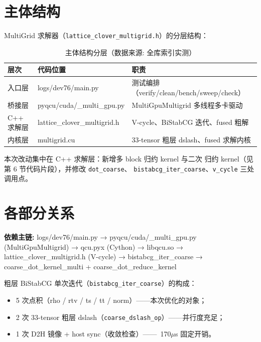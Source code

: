 \documentclass[UTF8]{ctexart}
\begin{document}
\section{主体结构}
MultiGrid 求解器（\texttt{lattice\_clover\_multigrid.h}）的分层结构：
\begin{table}[htbp]\centering
\begin{tabularx}{\textwidth}{llX}
\toprule
\textcolor{struct}{层次} & 代码位置 & \textcolor{struct}{职责} \\
\midrule
入口层 & logs/dev76/main.py & 测试编排（verify/clean/bench/sweep/check） \\
桥接层 & pyqcu/cuda/\_multi\_gpu.py & MultiGpuMultigrid 多线程多卡驱动 \\
C++ 求解层 & lattice\_clover\_multigrid.h & V-cycle、BiStabCG 迭代、fused 粗解 \\
内核层 & multigrid.cu & 33-tensor 粗层 dslash、fused 求解内核 \\
\bottomrule
\end{tabularx}
\caption{主体结构分层（数据来源: 全库索引实测）}
\end{table}

\textcolor{struct}{本次改动}集中在 C++ 求解层：新增多 block 归约 kernel 与二次
归约 kernel（见第 6 节代码片段），并修改 \texttt{dot\_coarse}、
\texttt{bistabcg\_iter\_coarse}、\texttt{v\_cycle} 三处调用点。

\section{各部分关系}
\begin{keybox}
\textbf{依赖主链:} \textcolor{relation}{logs/dev76/main.py → pyqcu/cuda/\_multi\_gpu.py
(MultiGpuMultigrid) → qcu.pyx (Cython) → libqcu.so → lattice\_clover\_multigrid.h
(V-cycle) → bistabcg\_iter\_coarse → coarse\_dot\_kernel\_multi +
coarse\_dot\_reduce\_kernel}
\end{keybox}

粗层 BiStabCG 单次迭代（\texttt{bistabcg\_iter\_coarse}）的构成：
\begin{itemize}
\item 5 次点积（rho / rtv / ts / tt / norm）——本次优化的对象；
\item 2 次 33-tensor 粗层 dslash（\texttt{coarse\_dslash\_op}）——并行度充足；
\item 1 次 D2H 镜像 + host sync（收敛检查）——~170$\mu$s 固定开销。
\end{itemize}
\end{document}
